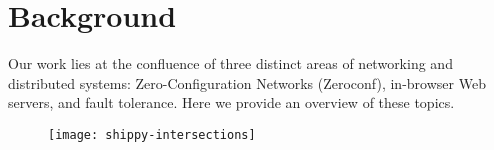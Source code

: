 \section{Background}
\label{sec:background}

Our work lies at the confluence of three distinct areas of networking and distributed systems: Zero-Configuration Networks (Zeroconf), in-browser Web servers, and fault tolerance.
Here we provide an overview of these topics.

\begin{figure}[h]
      \centering
      \texttt{[image: shippy-intersections]}
      \label{fig:stack}
\end{figure}






